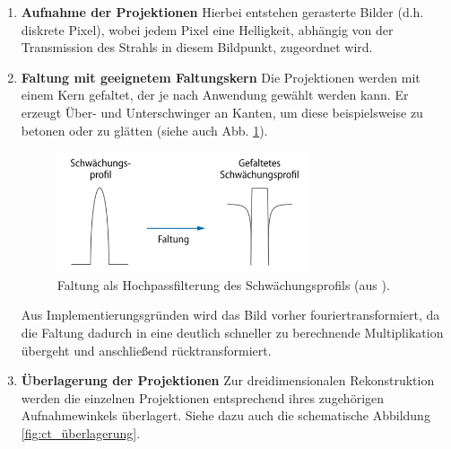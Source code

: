 \documentclass[11pt, a4paper]{article}
\numberwithin{equation}{section}
\begin{document}
\begin{enumerate}
	\item \textbf{Aufnahme der Projektionen} Hierbei entstehen gerasterte Bilder (d.h. diskrete Pixel), wobei jedem Pixel eine Helligkeit, abhängig von der Transmission des Strahls in diesem Bildpunkt, zugeordnet wird.
	\item \textbf{Faltung mit geeignetem Faltungskern} Die Projektionen werden mit einem Kern gefaltet, der je nach Anwendung gewählt werden kann.
	Er erzeugt Über- und Unterschwinger an Kanten, um diese beispielsweise zu betonen oder zu glätten (siehe auch Abb. \ref{fig:ct_faltung}).
	\begin{figure}
		\centering
		\includegraphics[width=0.7\textwidth]{./figures/ct/faltung.jpg}
		\caption{Faltung als Hochpassfilterung des Schwächungsprofils (aus \cite{alkadhi}).}
		\label{fig:ct_faltung}
	\end{figure}
	Aus Implementierungsgründen wird das Bild vorher fouriertransformiert, da die Faltung dadurch in eine deutlich schneller zu berechnende Multiplikation übergeht und anschließend rücktransformiert.
	\item \textbf{Überlagerung der Projektionen} Zur dreidimensionalen Rekonstruktion werden die einzelnen Projektionen entsprechend ihres zugehörigen Aufnahmewinkels überlagert.
	Siehe dazu auch die schematische Abbildung \ref{fig:ct_überlagerung}.
	\begin{figure}
		\centering

\end{figure}
\end{enumerate}
\end{document}
